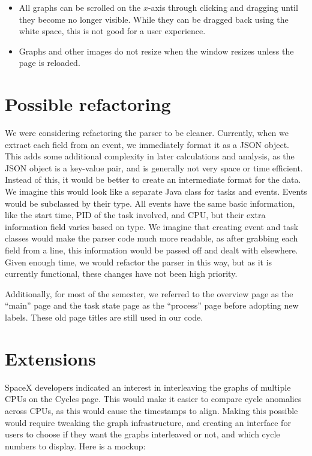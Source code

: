 \documentclass{hmcclinic}
\begin{document}
  \begin{itemize}
  
  \item All graphs can be scrolled on the $x$-axis through clicking and dragging until they become no longer visible. While
    they can be dragged back using the white space, this is not good for a user
    experience.

  \item Graphs and other images do not resize when the window resizes unless the
    page is reloaded.

\end{itemize}


  \section{Possible refactoring}

  We were considering refactoring the parser to be cleaner. Currently, when we
  extract each field from an event, we immediately format it as a JSON object.
  This adds some additional complexity in later calculations and analysis, as
  the JSON object is a key-value pair, and is generally not very space or time
  efficient. Instead of this, it would be better to create an intermediate
  format for the data. We imagine this would look like a separate Java class for
  tasks and events. Events would be subclassed by their type. All events have
  the same basic information, like the start time, PID of the task involved, and
  CPU, but their extra information field varies based on type. We imagine that
  creating event and task classes would make the parser code much more readable,
  as after grabbing each field from a line, this information would be passed off
  and dealt with elsewhere. Given enough time, we would refactor the parser in
  this way, but as it is currently functional, these changes have not been high
  priority.

  Additionally, for most of the semester, we referred to the overview page as the
  ``main'' page and the task state page as the ``process'' page before adopting
  new labels. These old page titles are still used in our code.

\section{Extensions}
  SpaceX developers indicated an interest in interleaving the graphs of multiple
  CPUs on the Cycles page.  This would make it easier to compare cycle
  anomalies across CPUs, as this would cause the timestamps to align. Making
  this possible would require tweaking the graph infrastructure, and creating an
  interface for users to choose if they want the graphs interleaved or not, and
  which cycle numbers to display. Here is a mockup:
\end{document}
